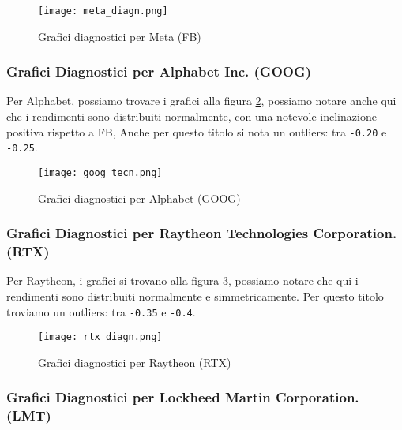 \begin{figure}[h]
  \centering
  \texttt{[image: meta\_diagn.png]}
  \caption{Grafici diagnostici per Meta (FB)}
  \label{fig:meta_diagn}
\end{figure}

\pagebreak

\subsubsection{Grafici Diagnostici per Alphabet Inc. (GOOG)}

Per Alphabet, possiamo trovare i grafici alla figura \ref{fig:goog_diagn}, possiamo notare anche qui che i rendimenti sono distribuiti normalmente, con una notevole inclinazione positiva rispetto a FB,
Anche per questo titolo si nota un outliers: tra \verb|-0.20| e \verb|-0.25|.

\vspace{3cm}

\begin{figure}[h]
  \centering
  \texttt{[image: goog\_tecn.png]}
  \caption{Grafici diagnostici per Alphabet (GOOG)}
  \label{fig:goog_diagn}
\end{figure}

\pagebreak

\subsubsection{Grafici Diagnostici per Raytheon Technologies Corporation. (RTX)}

Per Raytheon, i grafici si trovano alla figura \ref{fig:rtx_diagn}, possiamo notare che qui i rendimenti sono distribuiti normalmente e simmetricamente.
Per questo titolo troviamo un outliers: tra \verb|-0.35| e \verb|-0.4|.

\vspace{3cm}

\begin{figure}[h]
  \centering
  \texttt{[image: rtx\_diagn.png]}
  \caption{Grafici diagnostici per Raytheon (RTX)}
  \label{fig:rtx_diagn}
\end{figure}

\pagebreak

\subsubsection{Grafici Diagnostici per Lockheed Martin Corporation. (LMT)}

